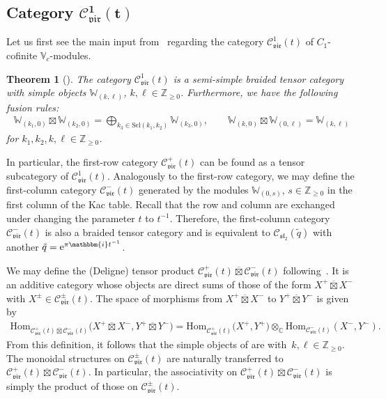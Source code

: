 \documentclass[pdftex]{sigma}
\numberwithin{equation}{section}
\newtheorem{thm}{Theorem}[section]
\newcommand{\Hom}{\mathrm{Hom}}
\newcommand{\TCprod}{\overline{\boxtimes}}
\newcommand{\bC}{\mathbb{C}}
\newcommand{\bZ}{\mathbb{Z}}
\newcommand{\cC}{\mathcal{C}}
\newcommand{\fsl}{\mathfrak{sl}}
\newcommand{\bbmi}{\mathbbm{i}}
\newcommand{\catQG}{\cC_{\fsl_{2}}}
\newcommand{\catVir}{\cC_{\vir}}
\newcommand{\Sel}{\mathrm{Sel}}
\newcommand{\virvoa}{\mathbb{V}}
\newcommand{\virmod}{\mathbb{W}}
\newcommand{\vir}{\mathfrak{vir}}
\begin{document}
\subsection[Category catVir\^1(t)]{Category $\boldsymbol{ \catVir^{1}(t)}$}
Let us first see the main input from~\cite{CJORY-tensor_categories_arising_from_Virasoro_algebra} regarding the category $\catVir^{1}(t)$
of $C_{1}$-cofinite $\virvoa_{c}$-modules.

\begin{thm}[\cite{CJORY-tensor_categories_arising_from_Virasoro_algebra}]
\label{thm:c1cat-tensor}
The category $\catVir^{1}(t)$ is a semi-simple braided tensor category with simple objects $\virmod_{(k,\ell)}$, $k,\ell\in \bZ_{\geq 0}$.
Furthermore, we have the following fusion rules:
\begin{align*}
	\virmod_{(k_{1},0)}\boxtimes\virmod_{(k_{2},0)} = \bigoplus_{k_{3}\in \Sel (k_{1},k_{2})}\virmod_{(k_{3},0)},\qquad
	\virmod_{(k,0)}\boxtimes\virmod_{(0,\ell)} = \virmod_{(k,\ell)}
\end{align*}
for $k_{1},k_{2},k,\ell\in\bZ_{\geq 0}$.
\end{thm}

In particular, the first-row category $\catVir^{+}(t)$ can be found as a tensor subcategory of $\catVir^{1}(t)$.
Analogously to the first-row category, we may define the first-column category $\catVir^{-}(t)$
generated by the modules $\virmod_{(0,s)}$, $s\in \bZ_{\geq 0}$ in the first column of the Kac table.
Recall that the row and column are exchanged under changing the parameter $t$ to $t^{-1}$.
Therefore, the first-column category $\catVir^{-}(t)$ is also a braided tensor category and is equivalent to
$\catQG (\tilde{q})$ with another ${\tilde{q} = {\rm e}^{\pi \bbmi t^{-1}}}$.

We may define the (Deligne) tensor product $\catVir^{+}(t) \TCprod\catVir^{-} (t)$ following~\cite[Section~4.6]{etingof2015tensor}.
It is an additive category whose objects are direct sums of those of the form $X^{+}\TCprod X^{-}$ with $X^{\pm}\in \catVir^{\pm}(t)$.
The space of morphisms from $X^{+}\TCprod X^{-}$ to $Y^{+}\TCprod Y^{-}$ is given by
\begin{gather*}
	\Hom_{\catVir^{+}(t)\TCprod\catVir^{-}(t)}\big(X^{+}\TCprod X^{-}, Y^{+}\TCprod Y^{-}\big) = \Hom_{\catVir^{+}(t)}\big(X^{+},Y^{+}\big)\otimes_{\bC} \Hom_{\catVir^{-}(t)}(X^{-},Y^{-}).
\end{gather*}
From this definition, it follows that the simple objects of \smash{$\catVir^{+}(t)\TCprod\catVir^{-}(t)$} are \smash{$\virmod_{(k,0)}\TCprod \virmod_{(0,\ell)}$} with~${k,\ell \in \bZ_{\geq 0}}$.
The monoidal structures on $\catVir^{\pm}(t)$ are naturally transferred to $\catVir^{+}(t)\TCprod\catVir^{-}(t)$.
In particular, the associativity on $\catVir^{+}(t)\TCprod\catVir^{-}(t)$ is simply the product of those on $\catVir^{\pm}(t)$.
\end{document}

